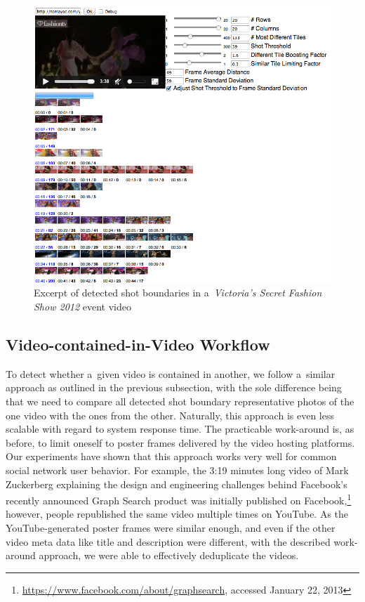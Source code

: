 \begin{figure}[!ht]
  \centering
  \includegraphics[width=1.0\linewidth]{./vsfashionshowboundaries.png}
  \caption[Excerpt of detected shot boundaries in an event video]
  {Excerpt of detected shot boundaries in a~\emph{Victoria's Secret Fashion Show 2012} event video}
  \label{fig:vsfashionshowboundaries}
\end{figure}

\subsection{Video-contained-in-Video Workflow}

To detect whether a~given video is contained in another,
we follow a~similar approach as outlined in the previous subsection,
with the sole difference being that we need to compare
all detected shot boundary representative photos of the one video
with the ones from the other.
Naturally, this approach is even less scalable
with regard to system response time.
The practicable work-around is, as before, to limit oneself
to poster frames delivered by the video hosting platforms.
Our experiments have shown that this approach works very well
for common social network user behavior.
For example, the 3:19 minutes long video of Mark Zuckerberg explaining
the design and engineering challenges behind Facebook's
recently announced Graph Search product was initially published
on Facebook,\footnote{\url{https://www.facebook.com/about/graphsearch},
accessed January 22, 2013} however, people republished the same video 
multiple times on YouTube.
As the YouTube-generated poster frames were similar enough,
and even if the other video meta data like title and description
were different, with the described work-around approach,
we were able to effectively deduplicate the videos.

